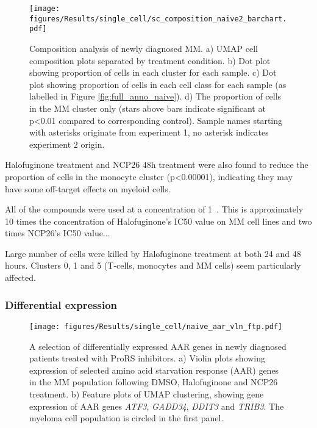 \begin{figure}[htb]
\centering
\texttt{[image: figures/Results/single\_cell/sc\_composition\_naive2\_barchart.pdf]}
\caption[scRNA-seq composition analysis- newly diagnosed MM]{Composition analysis of newly diagnosed MM.
    a) UMAP cell composition plots separated by treatment condition.
    b) Dot plot showing proportion of cells in each cluster for each sample.
    c) Dot plot showing proportion of cells in each cell class for each sample (as labelled in Figure \ref{fig:full_anno_naive}).
    d) The proportion of cells in the MM cluster only (stars above bars indicate significant at p<0.01 compared to corresponding control).
    Sample names starting with asterisks originate from experiment 1, no asterisk indicates experiment 2 origin.}
\label{fig:composition_naive}
\end{figure}

Halofuginone treatment and NCP26 48h treatment were also found to reduce the proportion of cells in the monocyte cluster (p<0.00001), indicating they may have some off-target effects on myeloid cells.

All of the compounds were used at a concentration of 1\si{\micro\Molar}.
This is approximately 10 times the concentration of Halofuginone's IC50 value on MM cell lines and two times NCP26's IC50 value...

Large number of cells were killed by Halofuginone treatment at both 24 and 48 hours.
Clusters 0, 1 and 5 (T-cells, monocytes and MM cells) seem particularly affected.

\subsubsection{Differential expression}

\begin{figure}[htb]
\centering
\texttt{[image: figures/Results/single\_cell/naive\_aar\_vln\_ftp.pdf]}
\caption[scRNA-seq differentially expressed AAR genes- newly diagnosed patients]{A selection of differentially expressed AAR genes in newly diagnosed patients treated with ProRS inhibitors.
    a) Violin plots showing expression of selected amino acid starvation response (AAR) genes in the MM population following DMSO, Halofuginone and NCP26 treatment.
    b) Feature plots of UMAP clustering, showing gene expression of AAR genes \textit{ATF3}, \textit{GADD34}, \textit{DDIT3} and \textit{TRIB3}.
The myeloma cell population is circled in the first panel.}
\label{fig:naive_aar_vln_ftp}
\end{figure}

